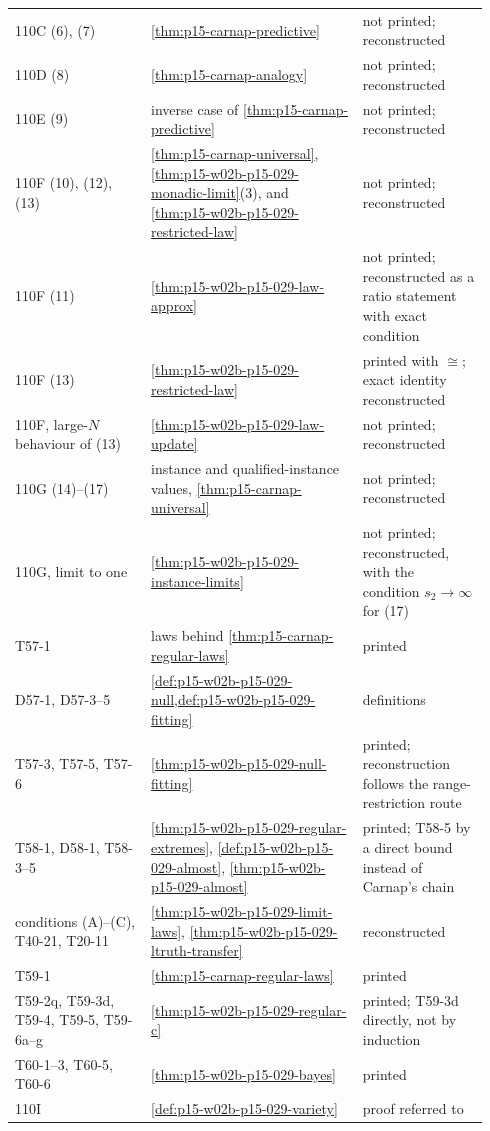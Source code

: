\begin{center}
\begin{tabular}{@{}p{0.27\linewidth}p{0.42\linewidth}p{0.25\linewidth}@{}}
110C (6), (7) & \cref{thm:p15-carnap-predictive} & not printed;
reconstructed\\
110D (8) & \cref{thm:p15-carnap-analogy} & not printed; reconstructed\\
110E (9) & inverse case of \cref{thm:p15-carnap-predictive} & not
printed; reconstructed\\
110F (10), (12), (13) & \cref{thm:p15-carnap-universal},
\cref{thm:p15-w02b-p15-029-monadic-limit}(3), and
\cref{thm:p15-w02b-p15-029-restricted-law} & not printed;
reconstructed\\
110F (11) & \cref{thm:p15-w02b-p15-029-law-approx} & not printed;
reconstructed as a ratio statement with exact condition\\
110F (13) & \cref{thm:p15-w02b-p15-029-restricted-law} & printed with
\(\cong\); exact identity reconstructed\\
110F, large-\(N\) behaviour of (13) & \cref{thm:p15-w02b-p15-029-law-update}
& not printed; reconstructed\\
110G (14)--(17) & instance and qualified-instance values,
\cref{thm:p15-carnap-universal} & not printed; reconstructed\\
110G, limit to one & \cref{thm:p15-w02b-p15-029-instance-limits} & not
printed; reconstructed, with the condition \(s_2\to\infty\) for (17)\\
T57-1 & laws behind \cref{thm:p15-carnap-regular-laws} & printed\\
D57-1, D57-3--5 & \cref{def:p15-w02b-p15-029-null,def:p15-w02b-p15-029-fitting}
& definitions\\
T57-3, T57-5, T57-6 & \cref{thm:p15-w02b-p15-029-null-fitting} &
printed; reconstruction follows the range-restriction route\\
T58-1, D58-1, T58-3--5 & \cref{thm:p15-w02b-p15-029-regular-extremes},
\cref{def:p15-w02b-p15-029-almost}, \cref{thm:p15-w02b-p15-029-almost}
& printed; T58-5 by a direct bound instead of Carnap's chain\\
conditions (A)--(C), T40-21, T20-11 & \cref{thm:p15-w02b-p15-029-limit-laws},
\cref{thm:p15-w02b-p15-029-ltruth-transfer} & reconstructed\\
T59-1 & \cref{thm:p15-carnap-regular-laws} & printed\\
T59-2q, T59-3d, T59-4, T59-5, T59-6a--g &
\cref{thm:p15-w02b-p15-029-regular-c} & printed; T59-3d directly, not
by induction\\
T60-1--3, T60-5, T60-6 & \cref{thm:p15-w02b-p15-029-bayes} & printed\\
110I & \cref{def:p15-w02b-p15-029-variety} & proof referred to

\end{tabular}
\end{center}
